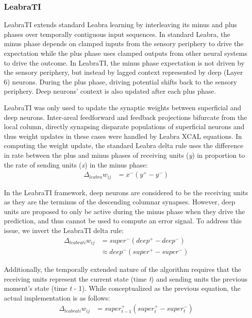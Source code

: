 \documentclass[10pt,letterpaper]{article}
\numberwithin{equation}{section}
\begin{document}
\subsubsection{LeabraTI}
LeabraTI extends standard Leabra learning by interleaving its minus and plus phases over temporally contiguous input sequences. In standard Leabra, the minus phase depends on clamped inputs from the sensory periphery to drive the expectation while the plus phase uses clamped outputs from other neural systems to drive the outcome. In LeabraTI, the minus phase expectation is not driven by the sensory periphery, but instead by lagged context represented by deep (Layer 6) neurons. During the plus phase, driving potential shifts back to the sensory periphery. Deep neurons' context is also updated after each plus phase.

LeabraTI was only used to update the synaptic weights between superficial and deep neurons. Inter-areal feedforward and feedback projections bifurcate from the local column, directly synapsing disparate populations of superficial neurons and thus weight updates in these cases were handled by Leabra XCAL equations. In computing the weight update, the standard Leabra delta rule \cite{OReilly:1996} uses the difference in rate between the plus and minus phases of receiving units (\textit{y}) in proportion to the rate of sending units (\textit{x}) in the minus phase:
\begin{align*}
\Delta_{leabra} w_{ij} &= x^-(y^+ - y^-)
\end{align*}

In the LeabraTI framework, deep neurons are considered to be the receiving units as they are the terminus of the descending columnar synapses. However, deep units are proposed to only be active during the minus phase when they drive the prediction, and thus cannot be used to compute an error signal.  To address this issue, we invert the LeabraTI delta rule:
\begin{align*}
\Delta_{leabrati} w_{ij} &= super^-(deep^+ - deep^-) \\
			  &\approx deep^-(super^+ - super^-)
\end{align*}

Additionally, the temporally extended nature of the algorithm requires that the receiving units represent the current state (time \textit{t}) and sending units the previous moment's state (time \textit{t} - 1). While conceptualized as the previous equation, the actual implementation is as follows:
\begin{align*}
\Delta_{leabrati} w_{ij} &= super_{t-1}^+(super_{t}^+ - super_{t}^-)
\end{align*}
\end{document}
